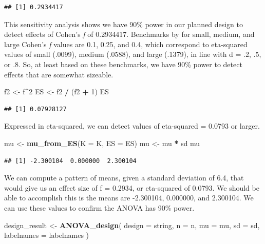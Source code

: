 \documentclass[
]{book}
\newenvironment{Shaded}{\begin{snugshade}}{\end{snugshade}}
\newcommand{\DataTypeTok}[1]{\textcolor[rgb]{0.13,0.29,0.53}{#1}}
\newcommand{\DecValTok}[1]{\textcolor[rgb]{0.00,0.00,0.81}{#1}}
\newcommand{\KeywordTok}[1]{\textcolor[rgb]{0.13,0.29,0.53}{\textbf{#1}}}
\newcommand{\NormalTok}[1]{#1}
\newcommand{\OperatorTok}[1]{\textcolor[rgb]{0.81,0.36,0.00}{\textbf{#1}}}
\newcommand{\StringTok}[1]{\textcolor[rgb]{0.31,0.60,0.02}{#1}}
\begin{document}
\begin{verbatim}
## [1] 0.2934417
\end{verbatim}

This sensitivity analysis shows we have 90\% power in our planned design to detect effects of Cohen's \emph{f} of 0.2934417. Benchmarks by \citet{cohen1988spa} for small, medium, and large Cohen's \emph{f} values are 0.1, 0.25, and 0.4, which correspond to eta-squared values of small (.0099), medium (.0588), and large (.1379), in line with d = .2, .5, or .8. So, at least based on these benchmarks, we have 90\% power to detect effects that are somewhat sizeable.

\begin{Shaded}
\begin{Highlighting}[]
\NormalTok{f2 <-}\StringTok{ }\NormalTok{f}\OperatorTok{^}\DecValTok{2}
\NormalTok{ES <-}\StringTok{ }\NormalTok{f2 }\OperatorTok{/}\StringTok{ }\NormalTok{(f2 }\OperatorTok{+}\StringTok{ }\DecValTok{1}\NormalTok{)}
\NormalTok{ES}
\end{Highlighting}
\end{Shaded}

\begin{verbatim}
## [1] 0.07928127
\end{verbatim}

Expressed in eta-squared, we can detect values of eta-squared = 0.0793 or larger.

\begin{Shaded}
\begin{Highlighting}[]
\NormalTok{mu <-}\StringTok{ }\KeywordTok{mu_from_ES}\NormalTok{(}\DataTypeTok{K =}\NormalTok{ K, }\DataTypeTok{ES =}\NormalTok{ ES)}
\NormalTok{mu <-}\StringTok{ }\NormalTok{mu }\OperatorTok{*}\StringTok{ }\NormalTok{sd}
\NormalTok{mu}
\end{Highlighting}
\end{Shaded}

\begin{verbatim}
## [1] -2.300104  0.000000  2.300104
\end{verbatim}

We can compute a pattern of means, given a standard deviation of 6.4, that would give us an effect size of f = 0.2934, or eta-squared of 0.0793. We should be able to accomplish this is the means are -2.300104, 0.000000, and 2.300104. We can use these values to confirm the ANOVA has 90\% power.

\begin{Shaded}
\begin{Highlighting}[]
\NormalTok{design_result <-}\StringTok{ }\KeywordTok{ANOVA_design}\NormalTok{(}
  \DataTypeTok{design =}\NormalTok{ string,}
  \DataTypeTok{n =}\NormalTok{ n,}
  \DataTypeTok{mu =}\NormalTok{ mu,}
  \DataTypeTok{sd =}\NormalTok{ sd,}
  \DataTypeTok{labelnames =}\NormalTok{ labelnames}
\NormalTok{  )}
\end{Highlighting}
\end{Shaded}
\end{document}
